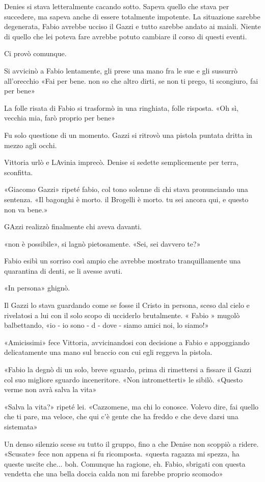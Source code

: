 Denies si stava letteralmente cacando sotto. Sapeva quello che stava per succedere, ma sapeva anche di essere totalmente impotente. La situazione sarebbe degenerata, Fabio avrebbe ucciso il Gazzi e tutto sarebbe andato ai maiali. Niente di quello che lei poteva fare avrebbe potuto cambiare il corso di questi eventi.

Ci provò comunque.

Si avvicinò a Fabio lentamente, gli prese una mano fra le sue e gli sussurrò all'orecchio «Fai per bene. non so che altro dirti, se non ti prego, ti scongiuro, fai per bene»

La folle risata di Fabio si trasformò in una ringhiata, folle risposta. «Oh sì, vecchia mia, farò proprio per bene»

Fu solo questione di un momento. Gazzi si ritrovò una pistola puntata dritta in mezzo agli occhi.

Vittoria urlò e LAvinia imprecò. Denise si sedette semplicemente per terra, sconfitta. 

«Giacomo Gazzi» ripeté fabio, col tono solenne di chi stava pronunciando una sentenza. «Il bagonghi è morto. il Brogelli è morto. tu sei ancora qui, e questo non va bene.» 

GAzzi realizzò finalmente chi aveva davanti.

«non è possibile», si lagnò pietosamente. «Sei, sei davvero te?»

Fabio esibì un sorriso così ampio che avrebbe mostrato tranquillamente una quarantina di denti, se li avesse avuti.

«In persona» ghignò.

Il Gazzi lo stava guardando come se fosse il Cristo in persona, sceso dal cielo e rivelatosi a lui con il solo scopo di ucciderlo brutalmente. « Fabio » mugolò balbettando, «io - io sono - d - dove - siamo amici noi, lo siamo!»

«Amicissimi» fece Vittoria, avvicinandosi con decisione a Fabio e appoggiando delicatamente una mano sul braccio con cui egli reggeva la pistola.

«Fabio la degnò di un solo, breve sguardo, prima di rimettersi a fissare il Gazzi col suo migliore sguardo inceneritore. «Non intrometterti» le sibilò. «Questo verme non avrà salva la vita»

«Salva la vita?» ripeté lei. «Cazzomene, ma chi lo conosce. Volevo dire, fai quello che ti pare, ma veloce, che qui c'è gente che ha freddo e che deve darsi una sistemata»

Un denso silenzio scese su tutto il gruppo, fino a che Denise non scoppiò a ridere. «Scusate» fece non appena si fu ricomposta. «questa ragazza mi spezza, ha queste uscite che... boh. Comunque ha ragione, eh. Fabio, sbrigati con questa vendetta che una bella doccia calda non mi farebbe proprio scomodo»

